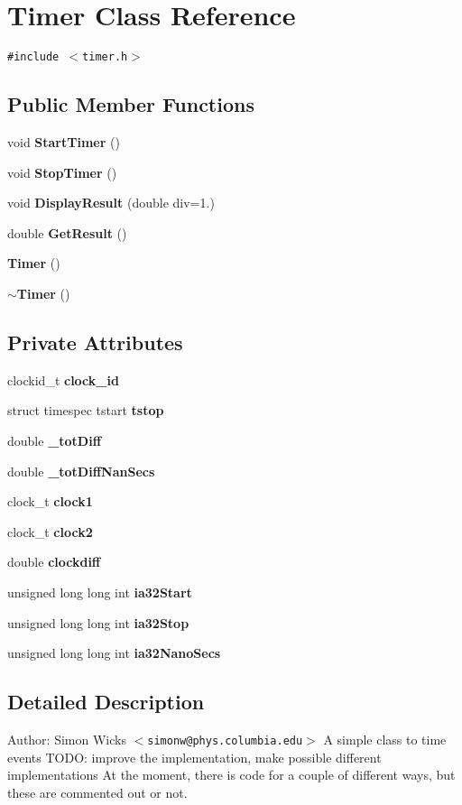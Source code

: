 \section{Timer Class Reference}
\label{classTimer}
{\tt \#include $<$timer.h$>$}

\subsection*{Public Member Functions}
\begin{CompactItemize}
\item 
void {\bf StartTimer} ()
\item 
void {\bf StopTimer} ()
\item 
void {\bf DisplayResult} (double div=1.)
\item 
double {\bf GetResult} ()
\item 
{\bf Timer} ()
\item 
{\bf $\sim$Timer} ()
\end{CompactItemize}
\subsection*{Private Attributes}
\begin{CompactItemize}
\item 
clockid\_\-t {\bf clock\_\-id}
\item 
struct timespec tstart {\bf tstop}
\item 
double {\bf \_\-totDiff}
\item 
double {\bf \_\-totDiffNanSecs}
\item 
clock\_\-t {\bf clock1}
\item 
clock\_\-t {\bf clock2}
\item 
double {\bf clockdiff}
\item 
unsigned long long int {\bf ia32Start}
\item 
unsigned long long int {\bf ia32Stop}
\item 
unsigned long long int {\bf ia32NanoSecs}
\end{CompactItemize}


\subsection{Detailed Description}
\begin{Desc}
\item[Author:]Simon Wicks $<${\tt simonw@phys.columbia.edu}$>$ A simple class to time events TODO: improve the implementation, make possible different implementations At the moment, there is code for a couple of different ways, but these are commented out or not. \end{Desc}


